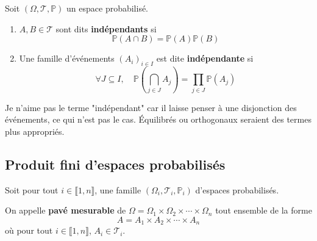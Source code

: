 \documentclass[a4paper,12pt]{article}
\begin{document}
\begin{definition}
    Soit $(\Omega, \mathcal{T}, \mathbb{P})$ un espace probabilisé.

    \begin{enumerate}[label=(\alph*)]
        \item $A, B \in \mathcal{T}$ sont dits \textbf{indépendants} si
        $$
            \mathbb{P}(A \cap B) = \mathbb{P}(A) \mathbb{P}(B)
        $$
        \item Une famille d'événements $(A_i)_{i \in I}$ est dite \textbf{indépendante} si
        $$
            \forall J \subseteq I, \quad \mathbb{P}\left( \bigcap_{j \in J} A_j \right) = \prod_{j \in J} \mathbb{P}(A_j)
        $$
    \end{enumerate}
\end{definition}

\begin{commentaire}
    Je n'aime pas le terme "indépendant" car il laisse penser à une disjonction des événements, ce qui n'est pas le cas. Équilibrés ou orthogonaux seraient des termes plus appropriés.
\end{commentaire}

\clearpage

\subsection{Produit fini d'espaces probabilisés}

\begin{definition}
    Soit pour tout $i \in \llbracket 1, n \rrbracket$, une famille $(\Omega_i, \mathcal{T}_i, \mathbb{P}_i)$ d'espaces probabilisés.

    On appelle \textbf{pavé mesurable} de $\Omega = \Omega_1 \times \Omega_2 \times \cdots \times \Omega_n$ tout ensemble de la forme
    $$
    A = A_1 \times A_2 \times \cdots \times A_n
    $$
    où pour tout $i \in \llbracket 1, n \rrbracket$, $A_i \in \mathcal{T}_i$.
\end{definition}
\end{document}
